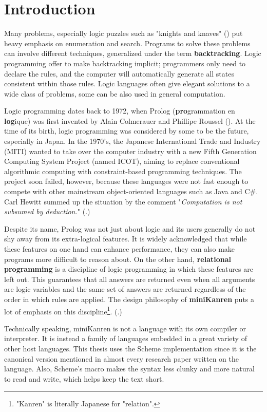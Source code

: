 \section{Introduction}
Many problems, especially logic puzzles such as "knights and knaves" (\cite{knight}) put heavy emphasis on enumeration and search. Programs to solve these problems can involve different techniques, generalized under the term \textbf{backtracking}. Logic programming offer to make backtracking implicit; programmers only need to declare the rules, and the computer will automatically generate all states consistent within those rules. Logic languages often give elegant solutions to a wide class of problems, some can be also used in general computation.

Logic programming dates back to 1972, when Prolog (\textbf{pro}grammation en \textbf{log}ique) was first invented by Alain Colmerauer and Phillipe Roussel (\cite{early-prolog}). At the time of its birth, logic programming was considered by some to be the future, especially in Japan. In the 1970's, the Japanese International Trade and Industry (MITI) wanted to take over the computer industry with a new Fifth Generation Computing System Project (named ICOT), aiming to replace conventional algorithmic computing with constraint-based programming techniques. The project soon failed, however, because these languages were not fast enough to compete with other mainstream object-oriented languages such as Java and C\#. Carl Hewitt summed up the situation by the comment "\textit{Computation is not subsumed by deduction.}" (\cite{logic-fail}.)

Despite its name, Prolog was not just about logic and its users generally do not shy away from its extra-logical features. It is widely acknowledged that while these features on one hand can enhance performance, they can also make programs more difficult to reason about. On the other hand, \textbf{relational programming} is a discipline of logic programming in which these features are left out. This guarantees that all answers are returned even when all arguments are logic variables and the same set of answers are returned regardless of the order in which rules are applied. The design philosophy of \textbf{miniKanren} puts a lot of emphasis on this discipline\footnote{"Kanren" is literally Japanese for "relation".}. (\cite{byrdphd}.)

Technically speaking, miniKanren is not a language with its own compiler or interpreter. It is instead a family of languages embedded in a great variety of other host languages. This thesis uses the Scheme implementation since it is the canonical version mentioned in almost every research paper written on the language. Also, Scheme's macro makes the syntax less clunky and more natural to read and write, which helps keep the text short.

